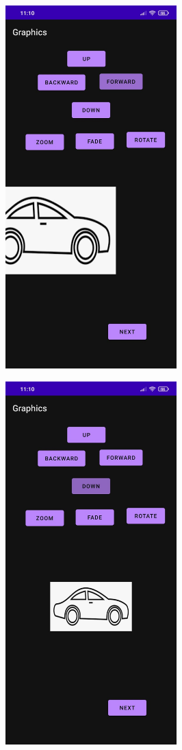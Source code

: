\documentclass[12pt,letterpaper]{article}
\begin{document}
\begin{figure}
    \centering
    \includegraphics[height=14cm, keepaspectratio]{Outputs/OP5.jpeg}
\end{figure}
\begin{figure}
    \centering
    \includegraphics[height=14cm, keepaspectratio]{Outputs/OP6.jpeg}
\end{figure}
\end{document}
